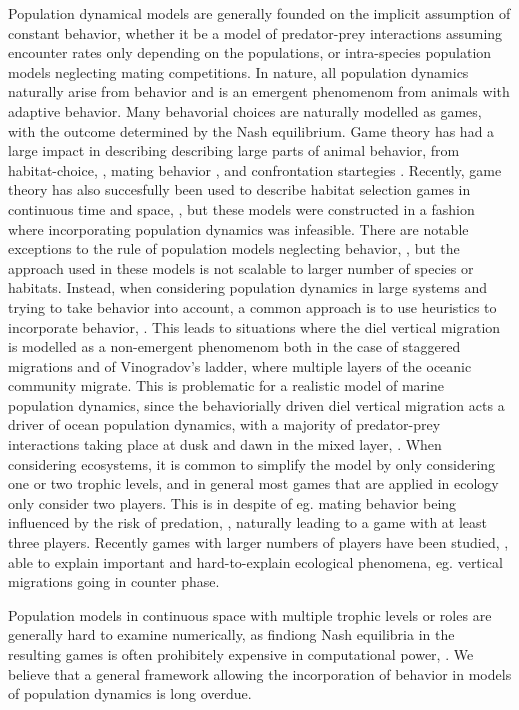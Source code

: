 Population dynamical models are generally founded on the implicit assumption of constant behavior, whether it be a model of predator-prey interactions assuming encounter rates only depending on the populations, or intra-species population models neglecting mating competitions. In nature, all population dynamics naturally arise from behavior and is an emergent phenomenom from animals with adaptive behavior. Many behavorial choices are naturally modelled as games, with the outcome determined by the Nash equilibrium. Game theory has had a large impact in describing describing large parts of animal behavior,  from habitat-choice, \citep{idealfreedistribution}, mating behavior  \citep{battleofthesexes}, and confrontation startegies \citep{hawkdove}. Recently, game theory has also succesfully been used to describe habitat selection games in continuous time and space, \citep{jerome,verticalmigration}, but these models were constructed in a fashion where incorporating population dynamics was infeasible. There are notable exceptions to the rule of population models neglecting behavior, \citep{Krivan1998,genkai2007macrophyte, sadowski2019predator}, but the approach used in these models is not scalable to larger number of species or habitats. Instead, when considering population dynamics in large systems and trying to take behavior into account, a common approach is to use heuristics to incorporate behavior, \citep{ho2019}. This leads to situations where the diel vertical migration is modelled as a non-emergent phenomenom \citep{danielpaper} both in the case of staggered migrations and of  Vinogradov's ladder, where multiple layers of the oceanic community migrate. This is problematic for a realistic model of marine population dynamics, since the behaviorially driven diel vertical migration acts a driver of ocean population dynamics, with a majority of predator-prey interactions taking place at dusk and dawn in the mixed layer,  \citep{benoit2014critical}. When considering ecosystems, it is common to simplify the model by only considering one or two trophic levels, and in general most games that are applied in ecology only consider two players. This is in despite of eg. mating behavior being influenced by the risk of predation, \citep{deer,birds}, naturally leading to a game with at least three players. Recently games with larger numbers of players have been studied, \citep{pinti2019trophic}, able to explain important and hard-to-explain ecological phenomena, eg. vertical migrations going in counter phase.

Population models in continuous space with multiple trophic levels or roles are generally hard to examine numerically, as findiong Nash equilibria in the resulting games is often prohibitely expensive in computational power, \citep{empirical_trait,abrams2010implications,pinti2019trophic}. We believe that a general framework allowing the incorporation of behavior in models of population dynamics is long overdue.

